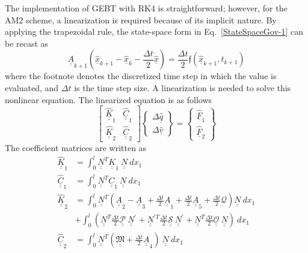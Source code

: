 \documentclass{aiaa-tc}
\newcommand{\tens}[1]{\underline{\underline{#1}}}
\renewcommand{\vec}[1]{\underline{#1}}
\begin{document}
The implementation of GEBT with RK4 is straightforward; however, for the AM2 scheme, a linearization is required because of its implicit nature. By applying the trapezoidal rule, the state-space form in Eq.~\eqref{StateSpaceGov-1} can be recast as
{\color{red}
\begin{equation}
    \label{AM2-Govn}
    \tens{A}_{k+1} (\hat{\vec{x}}_{k+1}-\hat{\vec{x}}_{k} - \frac{\Delta t}{2} \vec{\dot{\hat{x}}}) =  \frac{\Delta t}{2} \mathfrak{f}(\hat{\vec{x}}_{k+1},t_{k+1})  
\end{equation}
}
where the footnote denotes the discretized time step in which the value is evaluated, and $\Delta t$ is the time step size. A linearization is needed to solve this nonlinear equation. The linearized equation is as follows
\begin{equation}
    \label{AM2-Linearized}
    \begin{bmatrix}
    \hat{\tens{K}}_1 & \hat{\tens{C}}_1 \\
    \hat{\tens{K}}_2 & \hat{\tens{C}}_2
    \end{bmatrix}
    \begin{Bmatrix}
    \Delta \hat{\vec{q}} \\
    \Delta \hat{\vec{v}}
    \end{Bmatrix}
    =
    \begin{Bmatrix}
    \hat{\vec{F}}_1 \\
    \hat{\vec{F}}_2
    \end{Bmatrix}
\end{equation}
The coefficient matrices are written as
\begin{align}
    \label{Linear-K1}
    \hat{\tens{K}}_1 &= \int_0^l \tens{N}^T\tens{K}_1~\tens{N}~dx_1 \\
    \label{Linear-C1} 
    \hat{\tens{C}}_1 &= \int_0^l \tens{N}^T\tens{C}_1~\tens{N}~dx_1 \\
    \label{Linear-K2}
    \hat{\tens{K}}_2 &= \int_0^l  \tens{N}^T (\tens{A}_2 - \tens{A}_3 + \frac{\Delta t}{2} \tens{A}_1 + \frac{\Delta t}{2} \tens{A}_5 + \frac{\Delta t}{2} \mathcal{Q}) \tens{N}~dx_1 \nonumber \\
    &+ \int_0^l \left( \tens{N}^T \frac{\Delta t}{2} \tens{\mathcal{P}}~ \tens{N}^\prime + \tens{N}^{\prime T} \frac{\Delta t}{2} \tens{\mathcal{S}}~ \tens{N}^\prime + \tens{N}^T \frac{\Delta t}{2} \tens{\mathcal{O}}~ \tens{N}\right) ~dx_1 \\
    \label{Linear-C2}
    \hat{\tens{C}}_2 &= \int_0^l \tens{N}^T (\tens{\mathfrak{M}}+\frac{\Delta t}{2} \tens{A}_4)~\tens{N}~dx_1
\end{align}
\end{document}
